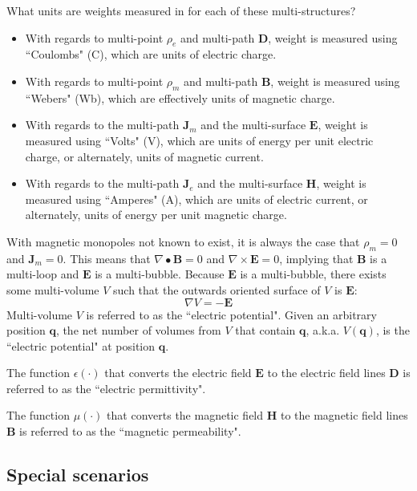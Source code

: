 \vspace{5mm}

What units are weights measured in for each of these multi-structures? 
\begin{itemize}
\item With regards to multi-point \(\rho_e\) and multi-path \(\mathbf{D}\), weight is measured using ``Coulombs" (C), which are units of electric charge. 
\item With regards to multi-point \(\rho_m\) and multi-path \(\mathbf{B}\), weight is measured using ``Webers" (Wb), which are effectively units of magnetic charge. 
\item With regards to the multi-path \(\mathbf{J}_m\) and the multi-surface \(\mathbf{E}\), weight is measured using ``Volts" (V), which are units of energy per unit electric charge, or alternately, units of magnetic current. 
\item With regards to the multi-path \(\mathbf{J}_e\) and the multi-surface \(\mathbf{H}\), weight is measured using ``Amperes" (A), which are units of electric current, or alternately, units of energy per unit magnetic charge. 
\end{itemize}

With magnetic monopoles not known to exist, it is always the case that \(\rho_m = 0\) and \(\mathbf{J}_m = 0\). This means that \(\nabla \bullet \mathbf{B} = 0\) and \(\nabla \times \mathbf{E} = 0\), implying that \(\mathbf{B}\) is a multi-loop and \(\mathbf{E}\) is a multi-bubble. Because \(\mathbf{E}\) is a multi-bubble, there exists some multi-volume \(V\) such that the outwards oriented surface of \(V\) is \(\mathbf{E}\):
\[\nabla V = -\mathbf{E}\]  
Multi-volume \(V\) is referred to as the ``electric potential". Given an arbitrary position \(\mathbf{q}\), the net number of volumes from \(V\) that contain \(\mathbf{q}\), a.k.a. \(V(\mathbf{q})\), is the ``electric potential" at position \(\mathbf{q}\).

The function \(\epsilon(\cdot)\) that converts the electric field \(\mathbf{E}\) to the electric field lines \(\mathbf{D}\) is referred to as the ``electric permittivity".

The function \(\mu(\cdot)\) that converts the magnetic field \(\mathbf{H}\) to the magnetic field lines \(\mathbf{B}\) is referred to as the ``magnetic permeability".




\subsection{Special scenarios}

